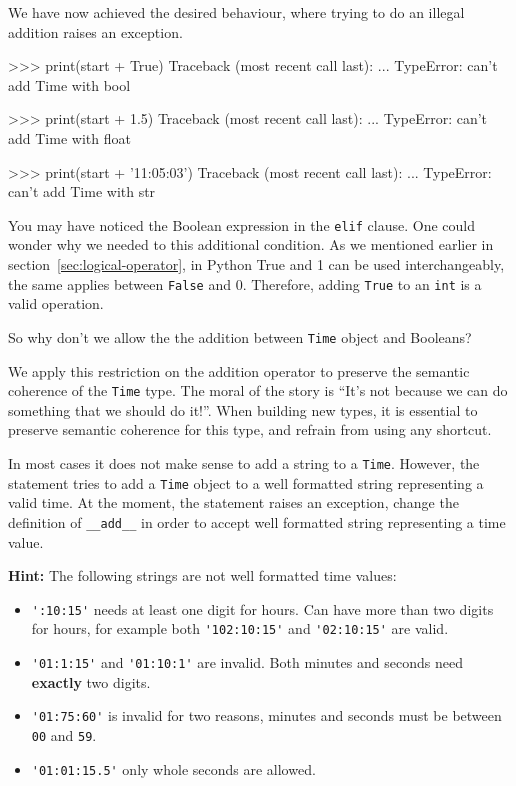 We have now achieved the desired behaviour, where trying to do an illegal addition raises an exception. 

\beforeverb
\begin{pyinterpreter}
>>> print(start + True)
Traceback (most recent call last):
...
TypeError: can't add Time with bool

>>> print(start + 1.5)
Traceback (most recent call last):
...
TypeError: can't add Time with float

>>> print(start + '11:05:03')
Traceback (most recent call last):
...
TypeError: can't add Time with str
\end{pyinterpreter}
\afterverb

\begin{remark}
You may have noticed the Boolean expression  in the {\tt elif} clause. One could wonder why we needed to this additional condition. As we mentioned earlier in section~\ref{sec:logical-operator}, in Python True and 1 can be used interchangeably, the same applies between {\tt False} and 0. Therefore, adding {\tt True} to an {\tt int} is a valid operation. 

So why don't we allow the the addition between {\tt Time} object and Booleans?

We apply this restriction on the addition operator to preserve the semantic coherence of the {\tt Time} type. The moral of the story is ``It's not because we can do something that we should do it!''. When building new types, it is essential to preserve semantic coherence for this type, and refrain from using any shortcut.
\end{remark}

\begin{exercise}
In most cases it does not make sense to add a string to a {\tt Time}. However, the statement  tries to add a {\tt Time} object to a well formatted string representing a valid time. At the moment, the statement raises an exception, change the definition of \verb|__add__| in order to accept well formatted string representing a time value.

{\bf Hint:} The following strings are not well formatted time values:
\begin{itemize}
	\item \verb|':10:15'| needs at least one digit for hours. Can have more than two digits for hours, for example both \verb|'102:10:15'| and \verb|'02:10:15'| are valid.
	\item \verb|'01:1:15'| and \verb|'01:10:1'| are invalid. Both minutes and seconds need {\bf exactly} two digits.
	\item \verb|'01:75:60'| is invalid for two reasons, minutes and seconds must be between {\tt 00} and {\tt 59}.
	\item \verb|'01:01:15.5'| only whole seconds are allowed.
\end{itemize}
\end{exercise}



